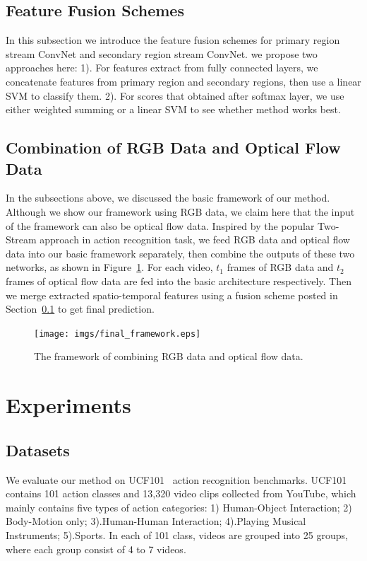 \documentclass[10pt,twocolumn,letterpaper]{article}
\begin{document}
\subsection{Feature Fusion Schemes}\label{sec:fusion}
In this subsection we introduce the feature fusion schemes for primary region stream ConvNet and secondary region stream ConvNet. we propose two approaches here: 1). For features extract from fully connected layers, we concatenate features from primary region and secondary regions, then use a  linear SVM to classify them. 2). For scores that obtained after softmax layer, we use either weighted summing or a linear SVM to see whether method works best.
\subsection{Combination of RGB Data and Optical Flow Data}
In the subsections above, we discussed the basic framework of our method. Although we show our framework using RGB data, we claim here that the input of the framework can also be optical flow data. Inspired by the popular Two-Stream approach in action recognition task, we feed RGB data and optical flow data into our basic framework separately, then combine the outputs of these two networks, as shown in Figure~\ref{final_framework}. For each video, $t_{1}$ frames of RGB data and $t_{2}$ frames of optical flow data are fed into the basic architecture respectively.  Then we merge extracted spatio-temporal features using a fusion scheme posted in Section~\ref{sec:fusion} to get final prediction.
\begin{figure}[!htbp]
	\begin{center}
		\texttt{[image: imgs/final\_framework.eps]}
		\caption{The framework of combining RGB data and optical flow data.}
		\label{final_framework}
	\end{center}
\end{figure}
\section{Experiments}  \label{sec:experiments}
%
\subsection{Datasets}
We evaluate our method on UCF101~\cite{soomro2012ucf101} action recognition benchmarks. UCF101~\cite{soomro2012ucf101} contains 101 action classes and 13,320 video clips collected from YouTube, which mainly contains five types of action categories: 1) Human-Object Interaction; 2) Body-Motion only; 3).Human-Human Interaction; 4).Playing Musical Instruments; 5).Sports. In each of 101 class, videos are grouped into 25 groups, where each group consist of 4 to 7 videos.
\end{document}
